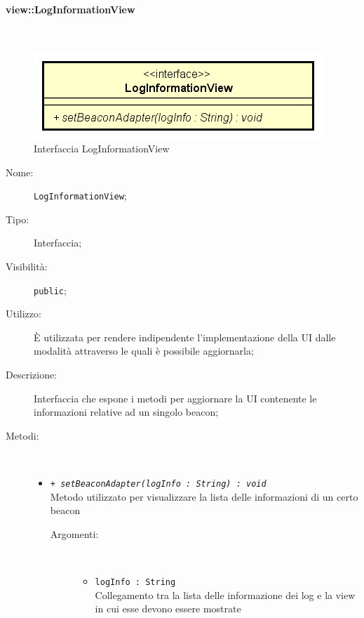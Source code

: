 \documentclass[../DefinizioneDiProdotto.tex]{subfiles}
\begin{document}
\paragraph{view::LogInformationView}
\
\begin{figure}[H]
	\centering
	\includegraphics[width=\maxwidth]{img/LogInformationView.png}
	\caption{Interfaccia LogInformationView}\label{fig:view::LogInformationView} 
\end{figure}
\begin{description}
	\item[Nome:] \texttt{LogInformationView};
	\item[Tipo:] Interfaccia;
	\item[Visibilità:] \texttt{public};
	\item[Utilizzo:] È utilizzata per rendere indipendente l'implementazione della UI dalle modalità attraverso le quali è possibile aggiornarla;
	\item[Descrizione:] Interfaccia che espone i metodi per aggiornare la UI contenente le informazioni relative ad un singolo beacon;
	\item[Metodi:] \
	\begin{itemize}
		\item \texttt{+ \textit{setBeaconAdapter(logInfo : String) : void}}\\
		Metodo utilizzato per visualizzare la lista delle informazioni di un certo beacon
		\begin{description}
			\item[Argomenti:] \
			\begin{itemize}
				\item \texttt{logInfo : String}\\
				Collegamento tra la lista delle informazione dei log e la view in cui esse devono essere mostrate\end{itemize}
		\end{description}
	\end{itemize}
\end{description}
\end{document}
